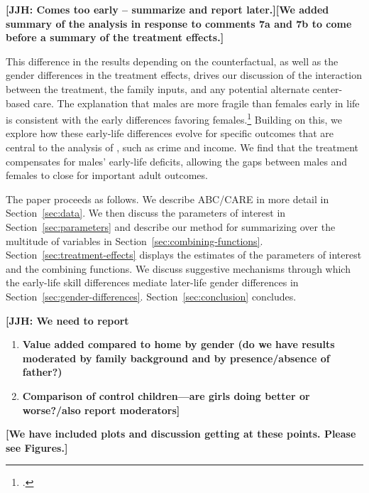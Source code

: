 \textbf{[JJH: Comes too early -- summarize and report later.][We added summary of the analysis in response to comments 7a and 7b to come before a summary of the treatment effects.]}

This difference in the results depending on the counterfactual, as well as the gender differences in the treatment effects, drives our discussion of the interaction between the treatment, the family inputs, and any potential alternate center-based care. The explanation that males are more fragile than females early in life is consistent with the early differences favoring females.\footnote{\citet{Kottelenberg-Lehrer_2014_Gender-Effects,Baker_Gruber_Milligan_2015_Noncog_Defects, Schore_2017_IMHJ}.} Building on this, we explore how these early-life differences evolve for specific outcomes that are central to the analysis of  \citet{Garcia_Heckman_Leaf_etal_2017_Comp_CBA_Unpublished}, such as crime and income. We find that the treatment compensates for males' early-life deficits, allowing the gaps between males and females to close for important adult outcomes.

The paper proceeds as follows. We describe ABC/CARE in more detail in Section~\ref{sec:data}. We then discuss the parameters of interest in Section~\ref{sec:parameters} and describe our method for summarizing over the multitude of variables in Section~\ref{sec:combining-functions}. Section~\ref{sec:treatment-effects} displays the estimates of the parameters of interest and the combining functions. We discuss suggestive mechanisms through which the early-life skill differences mediate later-life gender differences in Section~\ref{sec:gender-differences}. Section~\ref{sec:conclusion} concludes.


\textbf{[JJH: We need to report}
\begin{enumerate}[7(a)]
\item \textbf{Value added compared to home by gender (do we have results moderated by family background and by presence/absence of father?)}
\item \textbf{Comparison of control children---are girls doing better or worse?/also report moderators]}
\end{enumerate}

\textbf{[We have included plots and discussion getting at these points. Please see Figures.]}


